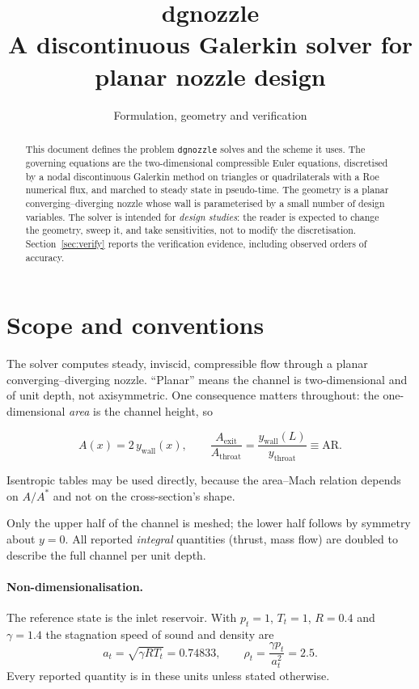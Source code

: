 \documentclass[11pt,a4paper]{article}
\title{\textbf{dgnozzle}\\[2mm]
  \large A discontinuous Galerkin solver for planar nozzle design}
\author{Formulation, geometry and verification}
\date{}
\newcommand{\code}[1]{\texttt{#1}}
\begin{document}
\maketitle

\begin{abstract}
\noindent
This document defines the problem \code{dgnozzle} solves and the scheme it uses.
The governing equations are the two-dimensional compressible Euler equations,
discretised by a nodal discontinuous Galerkin method on triangles or
quadrilaterals with a Roe numerical flux, and marched to steady state in
pseudo-time.  The geometry is a planar converging--diverging nozzle whose wall is
parameterised by a small number of design variables.  The solver is intended for
\emph{design studies}: the reader is expected to change the geometry, sweep it,
and take sensitivities, not to modify the discretisation.  Section~\ref{sec:verify}
reports the verification evidence, including observed orders of accuracy.
\end{abstract}

\tableofcontents
\bigskip

\section{Scope and conventions}

The solver computes steady, inviscid, compressible flow through a planar
converging--diverging nozzle.  ``Planar'' means the channel is two-dimensional
and of unit depth, not axisymmetric.  One consequence matters throughout: the
one-dimensional \emph{area} is the channel height, so

\begin{equation}
  A(x) = 2\,y_{\mathrm{wall}}(x),
  \qquad
  \frac{A_{\mathrm{exit}}}{A_{\mathrm{throat}}}
  = \frac{y_{\mathrm{wall}}(L)}{y_{\mathrm{throat}}}
  \equiv \mathrm{AR}.
  \label{eq:arearatio}
\end{equation}

Isentropic tables may be used directly, because the area--Mach relation depends
on $A/A^{*}$ and not on the cross-section's shape.

Only the upper half of the channel is meshed; the lower half follows by symmetry
about $y = 0$.  All reported \emph{integral} quantities (thrust, mass flow) are
doubled to describe the full channel per unit depth.

\paragraph{Non-dimensionalisation.}
The reference state is the inlet reservoir.  With $p_t = 1$, $T_t = 1$,
$R = 0.4$ and $\gamma = 1.4$ the stagnation speed of sound and density are
\begin{equation}
  a_t = \sqrt{\gamma R T_t} = 0.74833,
  \qquad
  \rho_t = \frac{\gamma p_t}{a_t^{2}} = 2.5 .
\end{equation}
Every reported quantity is in these units unless stated otherwise.
\end{document}
